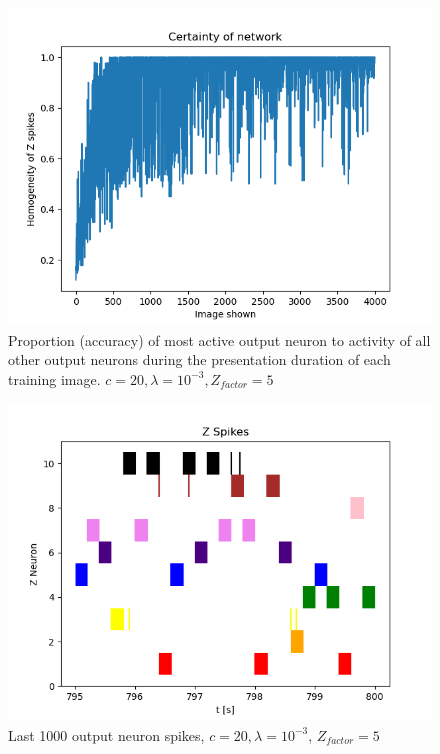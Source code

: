 \begin{figure}
  \includegraphics[width=\linewidth]{figures/horvert/horvert_c20_3_Zfactor5_averageZ.png}
  \caption{Proportion (accuracy) of most active output neuron  to activity of all other output neurons during the presentation duration of each training image. $c = 20, \lambda = 10^{-3}, Z_{factor} = 5$}
  \label{fig:horvert_c20_3_Zfactor5_averageZ}
\end{figure}

\begin{figure}
  \includegraphics[width=\linewidth]{figures/horvert/horvert_c20_3_Zfactor5_1000LastZSpikes.png}
  \caption{Last 1000 output neuron spikes, $c = 20, \lambda = 10^{-3}$, $Z_{factor} = 5$}
  \label{fig:horvertLastSpikes}
\end{figure}

